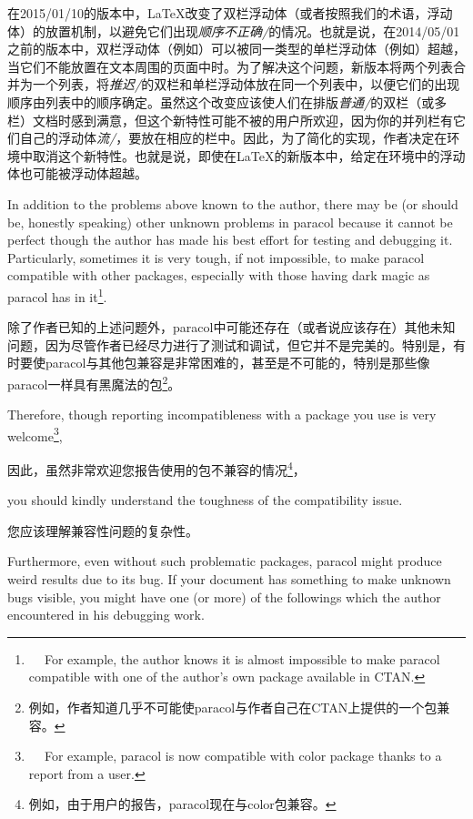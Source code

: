 \begin{itemize}
 在2015/01/10的版本中，\LaTeX{}改变了双栏浮动体（或者按照我们的术语，\pwise{}浮动体）的放置机制，以避免它们出现{\em 顺序不正确/}的情况。也就是说，在2014/05/01之前的版本中，双栏浮动体（例如）可以被同一类型的单栏浮动体（例如）超越，当它们不能放置在文本周围的页面中时。为了解决这个问题，新版本将两个列表合并为一个列表，将{\em 推迟/}的双栏和单栏浮动体放在同一个列表中，以便它们的出现顺序由列表中的顺序确定。虽然这个改变应该使人们在排版{\em 普通/}的双栏（或多栏）文档时感到满意，但这个新特性可能不被\Paracol{}的用户所欢迎，因为你的并列栏有它们自己的浮动体{\em 流/}，要放在相应的栏中。因此，为了简化\Paracol{}的实现，作者决定在环境中取消这个新特性。也就是说，即使在\LaTeX{}的新版本中，给定在环境中的\pwise{}浮动体也可能被\cwise{}浮动体超越。
 \end{itemize}
 
 In addition to the problems above known to the author, there may be (or
 should be, honestly speaking) other unknown problems in \textsf{paracol}
 because it cannot be perfect though the author has made his best effort
 for testing and debugging it.  Particularly, sometimes it is very tough,
 if not impossible, to make \textsf{paracol} compatible with other
 packages, especially with those having dark magic as \textsf{paracol} has
 in it\footnote{
 
 For example, the author knows it is almost impossible to make
 \textsf{paracol} compatible with one of the author's own package available
 in CTAN.}.

除了作者已知的上述问题外，\textsf{paracol}中可能还存在（或者说应该存在）其他未知问题，因为尽管作者已经尽力进行了测试和调试，但它并不是完美的。特别是，有时要使\textsf{paracol}与其他包兼容是非常困难的，甚至是不可能的，特别是那些像\textsf{paracol}一样具有黑魔法的包\footnote{
例如，作者知道几乎不可能使\textsf{paracol}与作者自己在CTAN上提供的一个包兼容。}。

 Therefore, though reporting incompatibleness with a package you use is
 very welcome\footnote{
 
 For example, \textsf{paracol} is now compatible with \textsf{color}
 package thanks to a report from a user.},

因此，虽然非常欢迎您报告使用的包不兼容的情况\footnote{例如，由于用户的报告，\textsf{paracol}现在与\textsf{color}包兼容。}，

 you should kindly understand the toughness of the compatibility issue.

您应该理解兼容性问题的复杂性。

 Furthermore, even without such problematic packages, \textsf{paracol}
 might produce weird results due to its bug.  If your document has
 something to make unknown bugs visible, you might have one (or more) of
 the followings which the author encountered in his debugging work.

